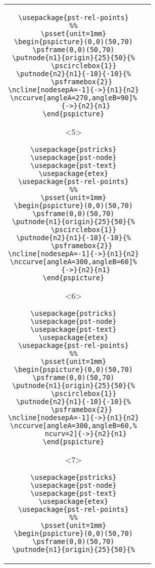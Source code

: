 \documentclass[handout]{beamer}
\begin{document}
\begin{frame}[fragile]
\begin{tabular}{@{}cc@{}}
\begin{onlyenv}
\begin{minipage}{62mm}
\begin{verbatim}
\usepackage{pst-rel-points}
%%
\psset{unit=1mm}
\begin{pspicture}(0,0)(50,70)
\psframe(0,0)(50,70)
\putnode{n1}{origin}{25}{50}{%
     \pscirclebox{1}}
\putnode{n2}{n1}{-10}{-10}{%
     \psframebox{2}} 
\ncline[nodesepA=-1]{->}{n1}{n2}
\nccurve[angleA=270,angleB=90]%
      {->}{n2}{n1}
\end{pspicture}
\end{verbatim}
\end{minipage}
\end{onlyenv}%
\begin{onlyenv}<5>
\begin{minipage}{62mm}
\begin{verbatim}
\usepackage{pstricks}
\usepackage{pst-node}
\usepackage{pst-text}
\usepackage{etex}
\usepackage{pst-rel-points}
%%
\psset{unit=1mm}
\begin{pspicture}(0,0)(50,70)
\psframe(0,0)(50,70)
\putnode{n1}{origin}{25}{50}{%
     \pscirclebox{1}}
\putnode{n2}{n1}{-10}{-10}{%
     \psframebox{2}} 
\ncline[nodesepA=-1]{->}{n1}{n2}
\nccurve[angleA=300,angleB=60]%
      {->}{n2}{n1}
\end{pspicture}
\end{verbatim}
\end{minipage}
\end{onlyenv}%
\begin{onlyenv}<6>
\begin{minipage}{62mm}
\begin{verbatim}
\usepackage{pstricks}
\usepackage{pst-node}
\usepackage{pst-text}
\usepackage{etex}
\usepackage{pst-rel-points}
%%
\psset{unit=1mm}
\begin{pspicture}(0,0)(50,70)
\psframe(0,0)(50,70)
\putnode{n1}{origin}{25}{50}{%
     \pscirclebox{1}}
\putnode{n2}{n1}{-10}{-10}{%
     \psframebox{2}} 
\ncline[nodesepA=-1]{->}{n1}{n2}
\nccurve[angleA=300,angleB=60,%
      ncurv=2]{->}{n2}{n1}
\end{pspicture}
\end{verbatim}
\end{minipage}
\end{onlyenv}%
\begin{onlyenv}<7>
\begin{minipage}{62mm}
\begin{verbatim}
\usepackage{pstricks}
\usepackage{pst-node}
\usepackage{pst-text}
\usepackage{etex}
\usepackage{pst-rel-points}
%%
\psset{unit=1mm}
\begin{pspicture}(0,0)(50,70)
\psframe(0,0)(50,70)
\putnode{n1}{origin}{25}{50}{%

\end{verbatim}
\end{minipage}
\end{onlyenv}
\end{tabular}
\end{frame}
\end{document}
